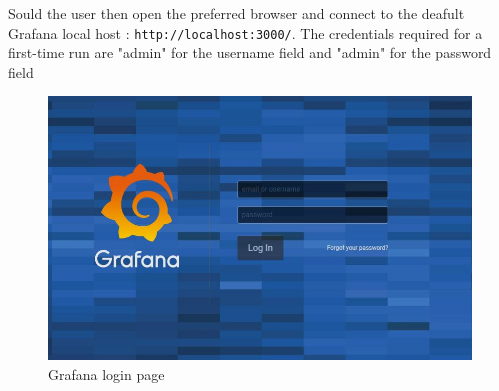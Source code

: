 Sould the user then open the preferred browser and connect to the deafult Grafana local host : \texttt{http://localhost:3000/}.
The credentials required for a first-time run are "admin" for the username field and "admin" for the password field
\begin{figure}[H]
\centering
\includegraphics[scale=0.65]{img/install/login.jpg}
\caption{Grafana login page}
\end{figure}